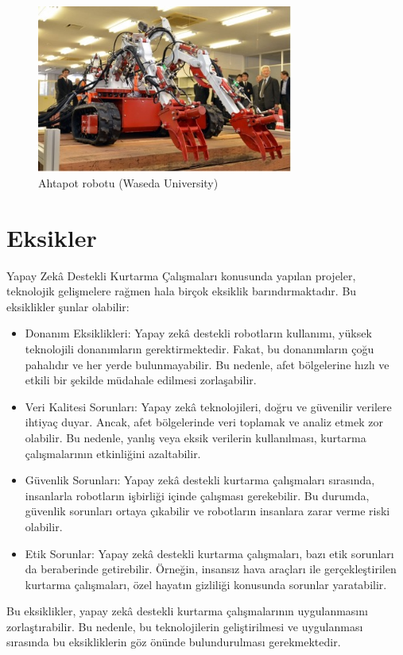 \documentclass{article}
\begin{document}
\begin{figure}[h]
\centering
\includegraphics[width=0.75\textwidth]{Images/Resim2.jpg}
\caption{Ahtapot robotu (Waseda University)}
\end{figure}

\section*{Eksikler}
Yapay Zekâ Destekli Kurtarma Çalışmaları konusunda yapılan projeler, teknolojik gelişmelere rağmen hala birçok eksiklik barındırmaktadır. Bu eksiklikler şunlar olabilir:
\begin{itemize}
    \item Donanım Eksiklikleri: Yapay zekâ destekli robotların kullanımı, yüksek teknolojili donanımların gerektirmektedir. Fakat, bu donanımların çoğu pahalıdır ve her yerde bulunmayabilir. Bu nedenle, afet bölgelerine hızlı ve etkili bir şekilde müdahale edilmesi zorlaşabilir.
    \item Veri Kalitesi Sorunları: Yapay zekâ teknolojileri, doğru ve güvenilir verilere ihtiyaç duyar. Ancak, afet bölgelerinde veri toplamak ve analiz etmek zor olabilir. Bu nedenle, yanlış veya eksik verilerin kullanılması, kurtarma çalışmalarının etkinliğini azaltabilir.
    \item Güvenlik Sorunları: Yapay zekâ destekli kurtarma çalışmaları sırasında, insanlarla robotların işbirliği içinde çalışması gerekebilir. Bu durumda, güvenlik sorunları ortaya çıkabilir ve robotların insanlara zarar verme riski olabilir.
    \item Etik Sorunlar: Yapay zekâ destekli kurtarma çalışmaları, bazı etik sorunları da beraberinde getirebilir. Örneğin, insansız hava araçları ile gerçekleştirilen kurtarma çalışmaları, özel hayatın gizliliği konusunda sorunlar yaratabilir.
\end{itemize}
Bu eksiklikler, yapay zekâ destekli kurtarma çalışmalarının uygulanmasını zorlaştırabilir. Bu nedenle, bu teknolojilerin geliştirilmesi ve uygulanması sırasında bu eksikliklerin göz önünde bulundurulması gerekmektedir.
\end{document}
